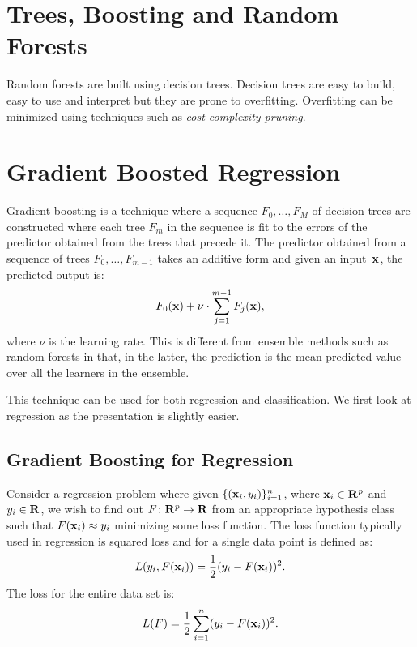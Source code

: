\chapter{Trees, Boosting and Random Forests}

Random forests are built using decision trees. Decision trees are easy to 
build, easy to use and interpret but they are prone to overfitting. Overfitting 
can be minimized using techniques such as \emph{cost complexity pruning}.

\chapter{Gradient Boosted Regression}

Gradient boosting is a technique where a sequence 
$F_0, \ldots, F_M$ of decision trees are constructed where 
each tree $F_m$ in the sequence is fit to the errors of the 
predictor obtained from the trees that precede it. The predictor obtained 
from a sequence of trees $F_0, \ldots, F_{m - 1}$ takes an additive 
form and given an input~$\mathbf{x}$, the predicted output is:
\begin{equation}
    F_0(\mathbf{x}) + \nu \cdot \sum_{j = 1}^{m - 1} F_j(\mathbf{x}),
\end{equation}  
where $\nu$ is the learning rate. This is different from ensemble methods 
such as random forests in that, in the latter, the prediction is the mean predicted 
value over all the learners in the ensemble. 

This technique can be used for both regression and classification. We first look
at regression as the presentation is slightly easier.

\section{Gradient Boosting for Regression}
Consider a regression problem where given $\{ (\mathbf{x}_i, y_i)\}_{i = 1}^n$, 
where $\mathbf{x}_i \in \mathbf{R}^p$ and $y_i \in \mathbf{R}$, we wish to find out 
$F \colon \mathbf{R}^p \to \mathbf{R}$ from an appropriate hypothesis class 
such that $F(\mathbf{x}_i) \approx y_i$ minimizing some 
loss function. The loss function typically used in regression is squared loss
and for a single data point is defined as:
\begin{equation}  
    \label{eqn:sq_loss_single}
    L(y_i, F(\mathbf{x}_i)) = \frac{1}{2} (y_i - F(\mathbf{x}_i))^2. 
\end{equation}
The loss for the entire data set is:
\begin{equation}
    \label{eqn:sq_loss_total}
    L(F) = \frac{1}{2} \sum_{i = 1}^{n} (y_i - F(\mathbf{x}_i))^2.
\end{equation}

